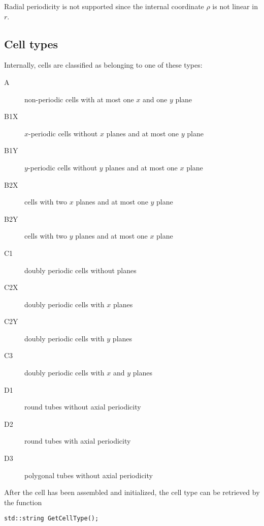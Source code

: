 Radial periodicity is not supported since the internal coordinate 
$\rho$ is not linear in $r$.

\subsection{Cell types}

Internally, cells are classified as belonging to one of these types:
\begin{description}
  \item[A]
  non-periodic cells with at most one \(x\) and one \(y\) plane
  \item[B1X]
  \(x\)-periodic cells without \(x\) planes and at most one \(y\) plane
  \item[B1Y]
  \(y\)-periodic cells without \(y\) planes and at most one \(x\) plane
  \item[B2X]
  cells with two \(x\) planes and at most one \(y\) plane
  \item[B2Y]
  cells with two \(y\) planes and at most one \(x\) plane
  \item[C1]
  doubly periodic cells without planes
  \item[C2X]
  doubly periodic cells with \(x\) planes
  \item[C2Y]
  doubly periodic cells with \(y\) planes
  \item[C3]
  doubly periodic cells with \(x\) and \(y\) planes
  \item[D1]
  round tubes without axial periodicity
  \item[D2]
  round tubes with axial periodicity
  \item[D3]
  polygonal tubes without axial periodicity
\end{description}

After the cell has been assembled and initialized, the cell type can be 
retrieved by the function
\begin{lstlisting}
std::string GetCellType();
\end{lstlisting}

